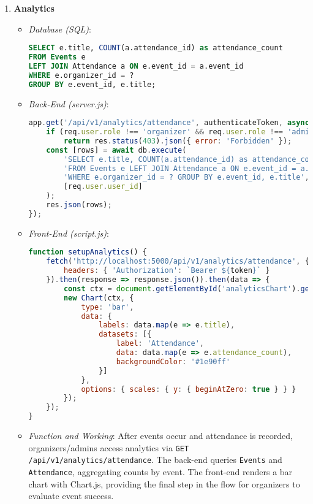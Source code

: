 \documentclass[12pt]{article}
\begin{document}
\begin{enumerate}
    \item \textbf{Analytics}
        \begin{itemize}
            \item \textit{Database (SQL)}:
\begin{lstlisting}[language=SQL, caption={Analytics Query}]
SELECT e.title, COUNT(a.attendance_id) as attendance_count
FROM Events e
LEFT JOIN Attendance a ON e.event_id = a.event_id
WHERE e.organizer_id = ?
GROUP BY e.event_id, e.title;
\end{lstlisting}
            \item \textit{Back-End (server.js)}:
\begin{lstlisting}[language=JavaScript, caption={Analytics Endpoint}]
app.get('/api/v1/analytics/attendance', authenticateToken, async (req, res) => {
    if (req.user.role !== 'organizer' && req.user.role !== 'admin') 
        return res.status(403).json({ error: 'Forbidden' });
    const [rows] = await db.execute(
        'SELECT e.title, COUNT(a.attendance_id) as attendance_count ' +
        'FROM Events e LEFT JOIN Attendance a ON e.event_id = a.event_id ' +
        'WHERE e.organizer_id = ? GROUP BY e.event_id, e.title', 
        [req.user.user_id]
    );
    res.json(rows);
});
\end{lstlisting}
            \item \textit{Front-End (script.js)}:
\begin{lstlisting}[language=JavaScript, caption={Analytics Visualization}]
function setupAnalytics() {
    fetch('http://localhost:5000/api/v1/analytics/attendance', {
        headers: { 'Authorization': `Bearer ${token}` }
    }).then(response => response.json()).then(data => {
        const ctx = document.getElementById('analyticsChart').getContext('2d');
        new Chart(ctx, {
            type: 'bar',
            data: {
                labels: data.map(e => e.title),
                datasets: [{
                    label: 'Attendance',
                    data: data.map(e => e.attendance_count),
                    backgroundColor: '#1e90ff'
                }]
            },
            options: { scales: { y: { beginAtZero: true } } }
        });
    });
}
\end{lstlisting}
            \item \textit{Function and Working}: 
                After events occur and attendance is recorded, organizers/admins access analytics via \texttt{GET /api/v1/analytics/attendance}. The back-end queries \texttt{Events} and \texttt{Attendance}, aggregating counts by event. The front-end renders a bar chart with Chart.js, providing the final step in the flow for organizers to evaluate event success.
        \end{itemize}
\end{enumerate}
\end{document}
